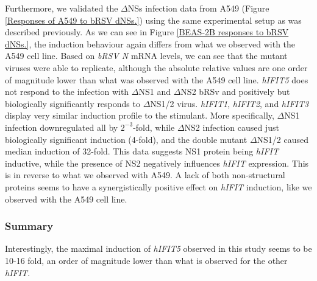 Furthermore, we validated the \(\Delta\)NSs infection data from A549 (Figure \ref{Responses of A549 to bRSV dNSs.}) using the same experimental setup as was described previously. As we can see in Figure \ref{BEAS-2B responses to bRSV dNSs.}, the induction behaviour again differs from what we observed with the A549 cell line. Based on \textit{bRSV N} mRNA levels, we can see that the mutant viruses were able to replicate, although the absolute relative values are one order of magnitude lower than what was observed with the A549 cell line. \textit{hIFIT5} does not respond to the infection with \(\Delta\)NS1 and \(\Delta\)NS2 bRSv and positively but biologically significantly responds to \(\Delta\)NS1/2 virus. \textit{hIFIT1}, \textit{hIFIT2}, and \textit{hIFIT3} display very similar induction profile to the stimulant. More specifically, \(\Delta\)NS1 infection downregulated all by \(2^{-3}\)-fold, while \(\Delta\)NS2 infection caused just biologically significant induction (4-fold), and the double mutant \(\Delta\)NS1/2 caused median induction of 32-fold. This data suggests NS1 protein being \textit{hIFIT} inductive, while the presence of NS2 negatively influences \textit{hIFIT} expression. This is in reverse to what we observed with A549. A lack of both non-structural proteins seems to have a synergistically positive effect on \textit{hIFIT} induction, like we observed with the A549 cell line.

\subsubsection*{Summary} \label{Summary-human-induction}
Interestingly, the maximal induction of \textit{hIFIT5} observed in this study seems to be 10-16 fold, an order of magnitude lower than what is observed for the other \textit{hIFIT}.